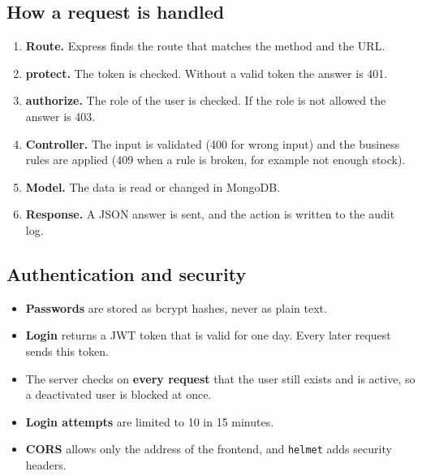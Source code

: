 \documentclass[11pt,a4paper]{article}
\newcommand{\code}[1]{\texttt{#1}}
\begin{document}
\subsection{How a request is handled}
\begin{enumerate}
  \item \textbf{Route.} Express finds the route that matches the method and the URL.
  \item \textbf{protect.} The token is checked. Without a valid token the answer is 401.
  \item \textbf{authorize.} The role of the user is checked. If the role is not allowed the answer is 403.
  \item \textbf{Controller.} The input is validated (400 for wrong input) and the business rules are applied (409 when a rule is broken, for example not enough stock).
  \item \textbf{Model.} The data is read or changed in MongoDB.
  \item \textbf{Response.} A JSON answer is sent, and the action is written to the audit log.
\end{enumerate}

\subsection{Authentication and security}
\begin{itemize}
  \item \textbf{Passwords} are stored as bcrypt hashes, never as plain text.
  \item \textbf{Login} returns a JWT token that is valid for one day. Every later request sends this token.
  \item The server checks on \textbf{every request} that the user still exists and is active, so a deactivated user is blocked at once.
  \item \textbf{Login attempts} are limited to 10 in 15 minutes.
  \item \textbf{CORS} allows only the address of the frontend, and \code{helmet} adds security headers.
\end{itemize}
\end{document}
